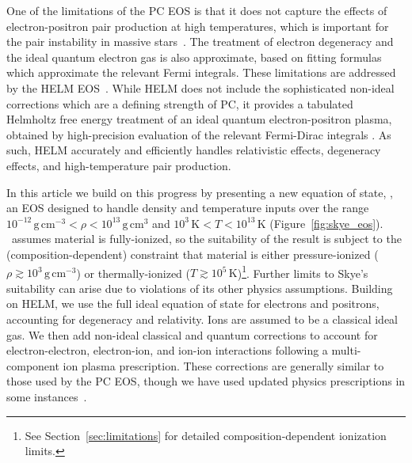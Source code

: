 One of the limitations of the PC EOS is that it does not capture the effects of electron-positron pair production at high temperatures, which is important for the pair instability in massive stars~\citep{1967ApJ...148..803R}.
The treatment of electron degeneracy and the ideal quantum electron gas is also approximate, based on fitting formulas which approximate the relevant Fermi integrals.
These limitations are addressed by the HELM EOS~\citep{Timmes2000}.
While HELM does not include the sophisticated non-ideal corrections which are a defining strength of PC, it provides a tabulated Helmholtz free energy treatment of an ideal quantum electron-positron plasma, obtained by high-precision evaluation of the relevant Fermi-Dirac integrals \citep{cloutman_1989_aa,aparicio_1998_aa,gong_2001_aa}.
As such, HELM accurately and efficiently handles relativistic effects, degeneracy effects, and high-temperature pair production.

In this article we build on this progress by presenting a new equation of state, \skye, an EOS designed to handle density and temperature inputs over the range $10^{-12}\,\mathrm{g\,cm^{-3}} < \rho < 10^{13}\,\mathrm{g\,cm^{3}}$ and $10^3\,\mathrm{K} < T < 10^{13}\,\mathrm{K}$ (Figure~\ref{fig:skye_eos}).
\skye \ assumes material is fully-ionized, so the suitability
of the result is subject to the (composition-dependent) constraint that material is either pressure-ionized ($\rho \gtrsim 10^3\,\mathrm{g\,cm^{-3}}$) or thermally-ionized ($T \gtrsim 10^{5}\,\mathrm{K}$)\footnote{See Section~\ref{sec:limitations} for detailed composition-dependent ionization limits.}.
Further limits to Skye's suitability can arise due to violations of its other physics assumptions.
Building on HELM, we use the full ideal equation of state for electrons and positrons, accounting for degeneracy and relativity.
Ions are assumed to be a classical ideal gas.
We then add non-ideal classical and quantum corrections to account for electron-electron, electron-ion, and ion-ion interactions following a multi-component ion plasma prescription.
These corrections are generally similar to those used by the PC EOS, though we have used updated physics prescriptions in some instances~\citep[e.g., those of][]{2019MNRAS.488.5042B}.

